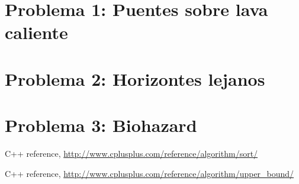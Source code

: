 \documentclass[11pt,a4paper]{article}
\begin{document}
\thispagestyle{empty}
\maketitle
\tableofcontents



\newpage
\section{Problema 1: Puentes sobre lava caliente}


\newpage
\section{Problema 2: Horizontes lejanos}


\newpage
\section{Problema 3: Biohazard}


\newpage
\begin{thebibliography}{2}

  C++ reference,
  \url{http://www.cplusplus.com/reference/algorithm/sort/}
  
  C++ reference,
  \url{http://www.cplusplus.com/reference/algorithm/upper_bound/}

  
\end{thebibliography}
\end{document}
